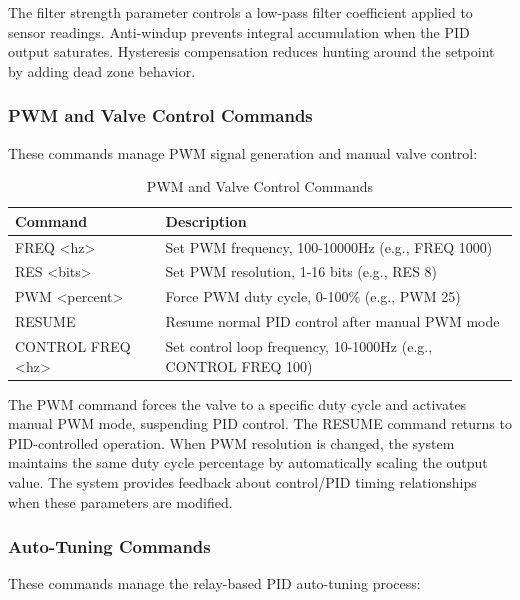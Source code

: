 The filter strength parameter controls a low-pass filter coefficient applied to sensor readings. Anti-windup prevents integral accumulation when the PID output saturates. Hysteresis compensation reduces hunting around the setpoint by adding dead zone behavior.

\subsubsection{PWM and Valve Control Commands}
These commands manage PWM signal generation and manual valve control:

\begin{table}[H]
\centering
\begin{tabular}{@{}ll@{}}
\toprule
\textbf{Command} & \textbf{Description} \\
\midrule
FREQ <hz> & Set PWM frequency, 100-10000Hz (e.g., FREQ 1000) \\
RES <bits> & Set PWM resolution, 1-16 bits (e.g., RES 8) \\
PWM <percent> & Force PWM duty cycle, 0-100\% (e.g., PWM 25) \\
RESUME & Resume normal PID control after manual PWM mode \\
CONTROL FREQ <hz> & Set control loop frequency, 10-1000Hz (e.g., CONTROL FREQ 100) \\
\bottomrule
\end{tabular}
\caption{PWM and Valve Control Commands}
\end{table}

The PWM command forces the valve to a specific duty cycle and activates manual PWM mode, suspending PID control. The RESUME command returns to PID-controlled operation. When PWM resolution is changed, the system maintains the same duty cycle percentage by automatically scaling the output value. The system provides feedback about control/PID timing relationships when these parameters are modified.

\subsubsection{Auto-Tuning Commands}
These commands manage the relay-based PID auto-tuning process:

